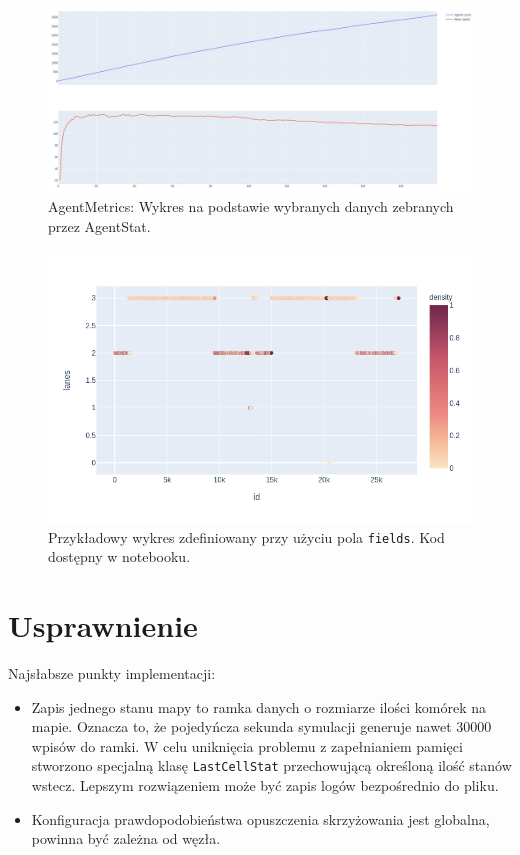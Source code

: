 \documentclass[a4paper,12pt]{article}
\begin{document}
    \begin{figure}[H]
    	\centering
    	\includegraphics[width=\textwidth]{img/sim-agents.jpg}
    	\caption{AgentMetrics: Wykres na podstawie wybranych danych zebranych przez AgentStat.}
    \end{figure}
    
    \begin{figure}[H]
    	\centering
    	\includegraphics[width=\textwidth]{img/note-custom.png}
    	\caption{Przykładowy wykres zdefiniowany przy użyciu pola \texttt{fields}. Kod dostępny w notebooku.}
    \end{figure}

    \section{Usprawnienie}
    Najsłabsze punkty implementacji:
    
    \begin{itemize}
    	\item Zapis jednego stanu mapy to ramka danych o rozmiarze ilości komórek na mapie. Oznacza to, że pojedyńcza sekunda symulacji generuje nawet 30000 wpisów do ramki. W celu uniknięcia problemu z zapełnianiem pamięci stworzono specjalną klasę \texttt{LastCellStat} przechowującą określoną ilość stanów wstecz.
    	Lepszym rozwiązeniem może być zapis logów bezpośrednio do pliku.
    	
    	\item Konfiguracja prawdopodobieństwa opuszczenia skrzyżowania jest globalna, powinna być zależna od węzła.
    \end{itemize}
\end{document}
